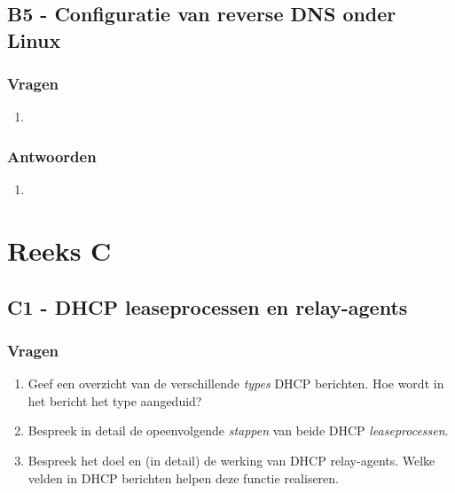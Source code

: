 \documentclass{report}
\begin{document}
\section{B5 - Configuratie van reverse DNS onder Linux}
\subsection{Vragen}
\begin{enumerate}
\item 
\end{enumerate}
\subsection{Antwoorden}
\begin{enumerate}
\item
\end{enumerate}

\chapter{Reeks C}

\section{C1 - DHCP leaseprocessen en relay-agents}
\subsection{Vragen}
\begin{enumerate}
\item {Geef een overzicht van de verschillende \textit{types} DHCP berichten. Hoe wordt in het bericht het type aangeduid?}
\item {Bespreek in detail de opeenvolgende \textit{stappen} van beide DHCP \textit{leaseprocessen}.}
\item {Bespreek het doel en (in detail) de werking van DHCP relay-agents. Welke velden in DHCP berichten helpen deze functie realiseren.}
\end{enumerate}
\end{document}
